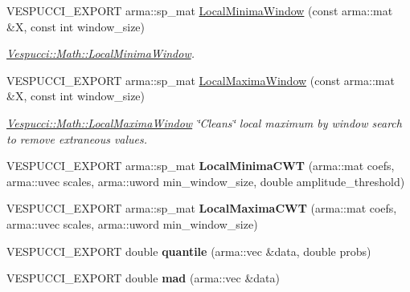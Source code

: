 \begin{DoxyCompactItemize}
V\+E\+S\+P\+U\+C\+C\+I\+\_\+\+E\+X\+P\+O\+RT arma\+::sp\+\_\+mat \hyperlink{namespace_vespucci_1_1_math_aa733b3b5afb314a357b8cb93d5280e66}{Local\+Minima\+Window} (const arma\+::mat \&X, const int window\+\_\+size)
\begin{DoxyCompactList}\small\item\em \hyperlink{namespace_vespucci_1_1_math_aa733b3b5afb314a357b8cb93d5280e66}{Vespucci\+::\+Math\+::\+Local\+Minima\+Window}. \end{DoxyCompactList}\item 
V\+E\+S\+P\+U\+C\+C\+I\+\_\+\+E\+X\+P\+O\+RT arma\+::sp\+\_\+mat \hyperlink{namespace_vespucci_1_1_math_a998cdb7a0c162505f38f660b622c35ae}{Local\+Maxima\+Window} (const arma\+::mat \&X, const int window\+\_\+size)
\begin{DoxyCompactList}\small\item\em \hyperlink{namespace_vespucci_1_1_math_a998cdb7a0c162505f38f660b622c35ae}{Vespucci\+::\+Math\+::\+Local\+Maxima\+Window} \char`\"{}\+Cleans\char`\"{} local maximum by window search to remove extraneous values. \end{DoxyCompactList}\item 
V\+E\+S\+P\+U\+C\+C\+I\+\_\+\+E\+X\+P\+O\+RT arma\+::sp\+\_\+mat {\bfseries Local\+Minima\+C\+WT} (arma\+::mat coefs, arma\+::uvec scales, arma\+::uword min\+\_\+window\+\_\+size, double amplitude\+\_\+threshold)\hypertarget{namespace_vespucci_1_1_math_ac8d752e6a0cfc592838ea29afc48e78f}{}\label{namespace_vespucci_1_1_math_ac8d752e6a0cfc592838ea29afc48e78f}

\item 
V\+E\+S\+P\+U\+C\+C\+I\+\_\+\+E\+X\+P\+O\+RT arma\+::sp\+\_\+mat {\bfseries Local\+Maxima\+C\+WT} (arma\+::mat coefs, arma\+::uvec scales, arma\+::uword min\+\_\+window\+\_\+size)\hypertarget{namespace_vespucci_1_1_math_af8201824346907fc4c88e45b07a1d90a}{}\label{namespace_vespucci_1_1_math_af8201824346907fc4c88e45b07a1d90a}

\item 
V\+E\+S\+P\+U\+C\+C\+I\+\_\+\+E\+X\+P\+O\+RT double {\bfseries quantile} (arma\+::vec \&data, double probs)\hypertarget{namespace_vespucci_1_1_math_ae68dc0148a7d71a4d8fc32d5bb529fe2}{}\label{namespace_vespucci_1_1_math_ae68dc0148a7d71a4d8fc32d5bb529fe2}

\item 
V\+E\+S\+P\+U\+C\+C\+I\+\_\+\+E\+X\+P\+O\+RT double {\bfseries mad} (arma\+::vec \&data)\hypertarget{namespace_vespucci_1_1_math_a969400e80b9f6bd1adf47db14cf4e38b}{}\label{namespace_vespucci_1_1_math_a969400e80b9f6bd1adf47db14cf4e38b}


\end{DoxyCompactItemize}
